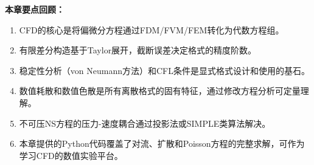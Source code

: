 \vspace{12pt}

\noindent\textbf{本章要点回顾：}
\begin{enumerate}
  \item CFD的核心是将偏微分方程通过FDM/FVM/FEM转化为代数方程组。
  \item 有限差分构造基于Taylor展开，截断误差决定格式的精度阶数。
  \item 稳定性分析（von Neumann方法）和CFL条件是显式格式设计和使用的基石。
  \item 数值耗散和数值色散是所有离散格式的固有特征，通过修改方程分析可定量理解。
  \item 不可压NS方程的压力-速度耦合通过投影法或SIMPLE类算法解决。
  \item 本章提供的Python代码覆盖了对流、扩散和Poisson方程的完整求解，可作为学习CFD的数值实验平台。
\end{enumerate}
